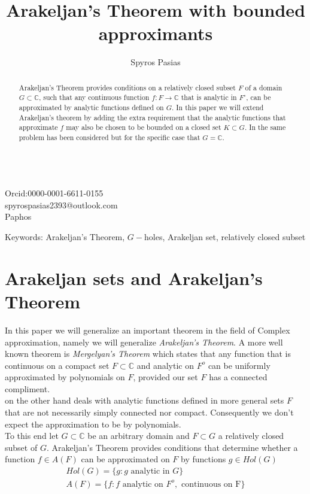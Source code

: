 \documentclass[12pt]{article}
\date{}
\begin{document}
\baselineskip 20pt
\title{Arakeljan's Theorem with bounded approximants}



\maketitle
\begin{center}


\author{Spyros Pasias}\\
\indent Orcid:0000-0001-6611-0155\\
\indent spyrospasias2393@outlook.com\\
\indent Paphos
\end{center}
\begin{abstract}
Arakeljan's Theorem provides conditions on a relatively closed subset $F$ of a domain $G\subset\mathbb{C}$, such that any continuous function $f:F\rightarrow\mathbb{C}$ that is analytic in $F^\circ$, can be approximated by analytic functions defined on $G$. In this paper we will extend Arakeljan's theorem by adding the extra requirement that the analytic functions that approximate $f$ may also be chosen to be bounded on a closed set $K\subset G.$ In \cite{RU} the same problem has been considered but for the specific case that $G=\mathbb{C}$.

\end{abstract}
\begin{center}

{Keywords}: Arakeljan's Theorem, $G-$holes, Arakeljan set, relatively closed subset\end{center}
\pagebreak
\section*{Arakeljan sets and Arakeljan's Theorem}

\indent In this paper we will generalize an important theorem in the field of Complex approximation, namely we will generalize \emph{Arakeljan's Theorem}. A more well known theorem is \emph{Mergelyan's Theorem} which states that any function that is continuous on a compact set $F\subset\mathbb{C}$ and analytic on $F^o$ can be uniformly approximated by polynomials on $F$, provided our set $F$ has a connected compliment.\\
 on the other hand deals with analytic functions defined in more general sets $F$ that are not necessarily simply connected nor compact. Consequently we don't expect the approximation to be by polynomials. \\
\indent To this end let $G\subset\mathbb{C}$ be an arbitrary domain and $F\subset G$ a relatively closed subset of $G$. {Arakeljan's Theorem} provides conditions that determine whether a function $f\in A(F)$ can be approximated on $F$ by functions $g\in Hol(G)$ 
\begin{align*}
Hol(G)=\lbrace  g: g\text{ analytic in }G\rbrace \\
 A(F)=\lbrace  f: f\text{ analytic on }F^o,\text{ continuous on F}\rbrace
\end{align*}
\end{document}
